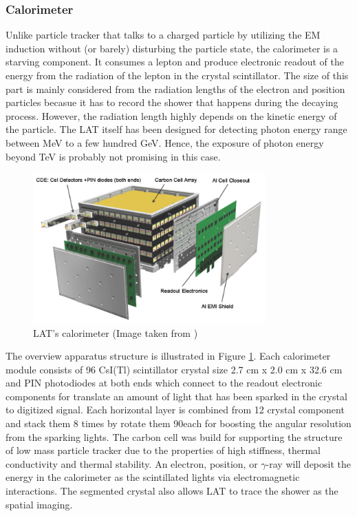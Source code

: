 \subsubsection{Calorimeter}
Unlike particle tracker that talks to a charged particle by utilizing
the EM induction without (or barely) disturbing the particle state,
the calorimeter is a starving component. It consumes a lepton and produce 
electronic readout of the energy from the radiation of the lepton in the
crystal scintillator. The size of this part is mainly considered 
from the radiation lengths of the electron and position particles becasue it has to record the shower that happens during the decaying process.
However, the radiation length highly depends on the kinetic energy 
of the particle. The LAT itself has been designed for detecting photon 
energy range between MeV to a few hundred GeV. Hence, the exposure of 
photon energy beyond TeV is probably not promising in this case.


\begin{figure}[h!]
    \centering
    \includegraphics[width=0.8\textwidth]{content/background/figures/fermi_calorimeter.png}
    \caption{LAT's calorimeter (Image taken from \cite{FermiLAT})}
    \label{fig:fermi_calorimeter}
\end{figure}

The overview apparatus structure is illustrated in Figure \ref{fig:fermi_calorimeter}.
Each calorimeter module consists of 96 CsI(Tl) scintillator crystal size 
2.7 cm x 2.0 cm x 32.6 cm and PIN photodiodes at both ends which connect 
to the readout electronic components for translate an amount of light 
that has been sparked in the crystal to digitized signal. Each horizontal 
layer is combined from 12 crystal component and stack them 8 times by 
rotate them 90\textdegree each for boosting the angular resolution 
from the sparking lights. The carbon cell was build for supporting 
the structure of low mass particle tracker due to the properties of 
high stiffness, thermal conductivity and thermal stability.
An electron, position, or $\gamma$-ray will deposit the energy in the
calorimeter as the scintillated lights via electromagnetic interactions.
The segmented crystal also allows LAT to trace the shower
as the spatial imaging.


